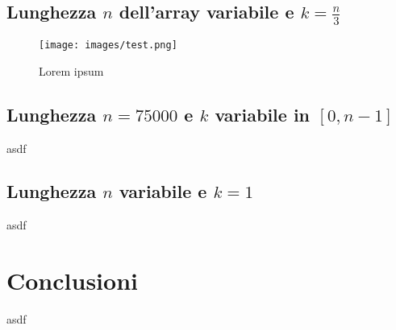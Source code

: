 \documentclass{article}
\begin{document}
	
	\subsection{Lunghezza $n$ dell'array variabile e $k=\frac{n}{3}$}
	
	\begin{figure}[h!]
  		\texttt{[image: images/test.png]}
  		\caption{Lorem ipsum}
  		\label{fig:graph1}
	\end{figure}	
	
	\newpage
	
	\subsection{Lunghezza $n=75000$ e $k$ variabile in $[0,n-1]$}
	asdf
	\newpage
	
	
	\subsection{Lunghezza $n$ variabile e $k=1$}
	asdf
	\newpage


	\section{Conclusioni}
	asdf
\end{document}
